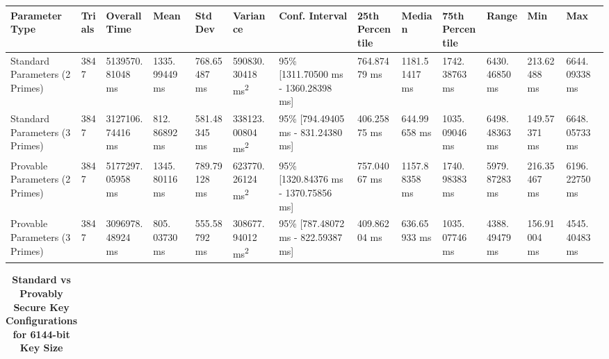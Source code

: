\documentclass[]{final_report}
\theoremstyle{definition}
\begin{document}
\begin{landscape}
\begin{table}[H]
\begin{tabular}{|p{2.5cm}|p{1cm}|p{1.5cm}|p{1.5cm}|p{1.5cm}|p{1.5cm}|p{2.5cm}|p{1.5cm}|p{1.75cm}|p{1.6cm}|p{1.5cm}|p{1.5cm}|p{1.55cm}|}
\hline
\textbf{Parameter Type} & \textbf{Trials} & \textbf{Overall Time} & \textbf{Mean} & \textbf{Std Dev} & \textbf{Variance} & \textbf{Conf. Interval} & \textbf{25th Percentile} & \textbf{Median} & \textbf{75th Percentile} & \textbf{Range} & \textbf{Min} & \textbf{Max} \\
\hline
Standard Parameters (2 Primes) & 3847 & 5139570.
81048 ms & 1335.
99449 ms & 768.65487 ms & 590830.
30418 ms\textsuperscript{2} & 95\% [1311.70500 ms - 1360.28398 ms] & 764.87479 ms & 1181.51417 ms & 1742.
38763 ms & 6430.
46850 ms & 213.62488 ms & 6644.
09338 ms \\
\hline
Standard Parameters (3 Primes) & 3847 & 3127106.
74416 ms & 812.
86892 ms & 581.48345 ms & 338123.
00804 ms\textsuperscript{2} & 95\% [794.49405 ms - 831.24380 ms] & 406.25875 ms & 644.99658 ms & 1035.
09046 ms & 6498.
48363 ms & 149.57371 ms & 6648.
05733 ms \\
\hline
Provable Parameters (2 Primes) & 3847 & 5177297.
05958 ms & 1345.
80116 ms & 789.79128 ms & 623770.
26124 ms\textsuperscript{2} & 95\% [1320.84376 ms - 1370.75856 ms] & 757.04067 ms & 1157.88358 ms & 1740.
98383 ms & 5979.
87283 ms & 216.35467 ms & 6196.
22750 ms \\
\hline
Provable Parameters (3 Primes) & 3847 & 3096978.
48924 ms & 805.
03730 ms & 555.58792 ms & 308677.
94012 ms\textsuperscript{2} & 95\% [787.48072 ms - 822.59387 ms] & 409.86204 ms & 636.65933 ms & 1035.
07746 ms & 4388.
49479 ms & 156.91004 ms & 4545.
40483 ms \\
\hline
\end{tabular}
\label{keyGen_5120bit_table}
\end{table}

\begin{table}[H]
\caption{\textbf{Standard vs Provably Secure Key Configurations for 6144-bit Key Size}}
\centering

\begin{tabular}{|p{2.5cm}|p{1cm}|p{1.5cm}|p{1.6cm}|p{1.3cm}|p{1.5cm}|p{2.5cm}|p{1.5cm}|p{1.38cm}|p{1.7cm}|p{1.5cm}|p{1.5cm}|p{1.7cm}|}


\end{tabular}
\end{table}
\end{landscape}
\end{document}
